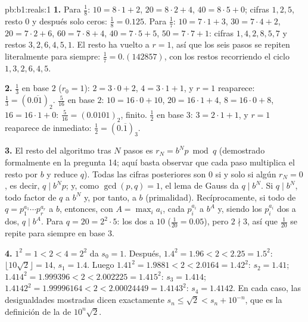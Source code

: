 \begin{solution}{pb:b1:reals:1}
\textbf{1.} Para $\frac 18$: $10 = 8 \cdot 1 + 2$,
$20 = 8 \cdot 2 + 4$, $40 = 8 \cdot 5 + 0$; cifras $1, 2, 5$, resto
$0$ y después solo ceros: $\frac 18 = 0.125$. Para $\frac 17$:
$10 = 7 \cdot 1 + 3$, $30 = 7 \cdot 4 + 2$, $20 = 7 \cdot 2 + 6$,
$60 = 7 \cdot 8 + 4$, $40 = 7 \cdot 5 + 5$, $50 = 7 \cdot 7 + 1$:
cifras $1, 4, 2, 8, 5, 7$ y restos $3, 2, 6, 4, 5, 1$. El resto ha
vuelto a $r = 1$, así que los seis pasos se repiten literalmente para
siempre: $\frac 17 = 0.(142857)$, con los restos recorriendo el ciclo
$1, 3, 2, 6, 4, 5$.

\textbf{2.} $\frac 13$ en base $2$ ($r_0 = 1$): $2 = 3 \cdot 0 + 2$,
$4 = 3 \cdot 1 + 1$, y $r = 1$ reaparece:
$\frac 13 = (0.\overline{01})_2$. $\frac{5}{16}$ en base $2$:
$10 = 16 \cdot 0 + 10$, $20 = 16 \cdot 1 + 4$, $8 = 16 \cdot 0 + 8$,
$16 = 16 \cdot 1 + 0$: $\frac{5}{16} = (0.0101)_2$, finito. $\frac 12$
en base $3$: $3 = 2 \cdot 1 + 1$, y $r = 1$ reaparece de inmediato:
$\frac 12 = (0.\overline{1})_3$.

\textbf{3.} El resto del algoritmo tras $N$ pasos es
$r_N = b^N p \bmod q$ (demostrado formalmente en la pregunta 14; aquí
basta observar que cada paso multiplica el resto por $b$ y reduce
 $q$). Todas las cifras posteriores son $0$ si y solo si algún
$r_N = 0$, es decir, $q \mid b^N p$; y, como $\gcd(p, q) = 1$, el lema
de Gauss da $q \mid b^N$. Si $q \mid b^N$, todo factor  de $q$
 a $b^N$ y, por tanto,  a $b$ (primalidad).
Recíprocamente, si todo  de $q = p_1^{a_1} \cdots p_r^{a_r}$
 a $b$, entonces, con $A = \max_i a_i$, cada $p_i^{a_i}$
 a $b^A$ y, siendo los $p_i^{a_i}$  dos a dos,
$q \mid b^A$. Para $q = 20 = 2^2 \cdot 5$: los dos   a
$10$ ($\frac{1}{20} = 0.05$), pero $2 \nmid 3$, así que
$\frac{1}{20}$ se repite para siempre en base $3$.

\textbf{4.} $1^2 = 1 < 2 < 4 = 2^2$ da $s_0 = 1$. Después,
$1.4^2 = 1.96 < 2 < 2.25 = 1.5^2$: $\lfloor 10\sqrt 2 \rfloor = 14$,
$s_1 = 1.4$. Luego $1.41^2 = 1.9881 < 2 < 2.0164 = 1.42^2$:
$s_2 = 1.41$; $1.414^2 = 1.999396 < 2 < 2.002225 = 1.415^2$:
$s_3 = 1.414$; $1.4142^2 = 1.99996164 < 2 < 2.00024449 = 1.4143^2$:
$s_4 = 1.4142$. En cada caso, las desigualdades mostradas dicen
exactamente $s_n \leq \sqrt 2 < s_n + 10^{-n}$, que es la definición de
la  de $10^n \sqrt 2$.


\end{solution}
